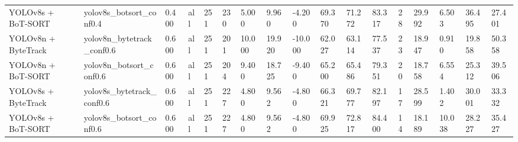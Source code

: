 \begin{tabular}{lllllllllllllllll}
YOLOv8s + BoT-SORT & yolov8s\_botsort\_conf0.4 & 0.400 & all & 251 & 230 & 5.000 & 9.960 & -4.200 & 69.370 & 71.272 & 83.317 & 28 & 29.992 & 6.503 & 36.495 & 27.401 \\
YOLOv8n + ByteTrack & yolov8n\_bytetrack\_conf0.6 & 0.600 & all & 251 & 201 & 10.000 & 19.920 & -10.000 & 62.027 & 63.114 & 77.537 & 23 & 18.947 & 0.910 & 19.858 & 50.358 \\
YOLOv8n + BoT-SORT & yolov8n\_botsort\_conf0.6 & 0.600 & all & 251 & 204 & 9.400 & 18.725 & -9.400 & 65.200 & 65.486 & 79.351 & 20 & 18.758 & 6.554 & 25.312 & 39.506 \\
YOLOv8s + ByteTrack & yolov8s\_bytetrack\_conf0.6 & 0.600 & all & 251 & 227 & 4.800 & 9.562 & -4.800 & 66.321 & 69.777 & 82.197 & 17 & 28.599 & 1.402 & 30.001 & 33.332 \\
YOLOv8s + BoT-SORT & yolov8s\_botsort\_conf0.6 & 0.600 & all & 251 & 227 & 4.800 & 9.562 & -4.800 & 69.925 & 72.817 & 84.400 & 14 & 18.189 & 10.038 & 28.227 & 35.427 \\
\bottomrule
\end{tabular}

